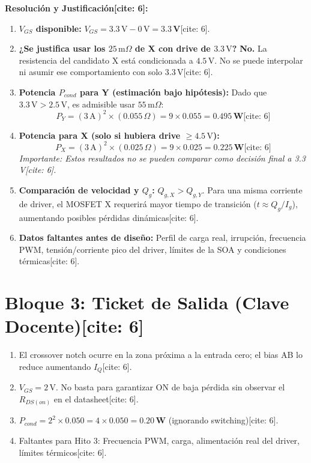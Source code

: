 \documentclass[11pt, a4paper]{article}
\begin{document}
\textbf{Resolución y Justificación[cite: 6]:}
\begin{enumerate}
    \item \textbf{$V_{GS}$ disponible:} $V_{GS} = 3.3\,\text{V} - 0\,\text{V} = \mathbf{3.3\,\text{V}}$[cite: 6].
    \item \textbf{¿Se justifica usar los $25\,\text{m}\Omega$ de X con drive de $3.3\,\text{V}$?} \textbf{No.} La resistencia del candidato X está condicionada a $4.5\,\text{V}$. No se puede interpolar ni asumir ese comportamiento con solo $3.3\,\text{V}$[cite: 6].
    \item \textbf{Potencia $P_{cond}$ para Y (estimación bajo hipótesis):} Dado que $3.3\,\text{V} > 2.5\,\text{V}$, es admisible usar $55\,\text{m}\Omega$:
    \begin{equation*}
        P_Y = (3\,\text{A})^2 \times (0.055\,\Omega) = 9 \times 0.055 = \mathbf{0.495\,\text{W}} \text{[cite: 6]}
    \end{equation*}
    \item \textbf{Potencia para X (solo si hubiera drive $\ge 4.5\,\text{V}$):}
    \begin{equation*}
        P_X = (3\,\text{A})^2 \times (0.025\,\Omega) = 9 \times 0.025 = \mathbf{0.225\,\text{W}} \text{[cite: 6]}
    \end{equation*}
    \textit{Importante: Estos resultados no se pueden comparar como decisión final a 3.3 V[cite: 6].}
    \item \textbf{Comparación de velocidad y $Q_g$:} $Q_{g,X} > Q_{g,Y}$. Para una misma corriente de driver, el MOSFET X requerirá mayor tiempo de transición ($t \approx Q_g/I_g$), aumentando posibles pérdidas dinámicas[cite: 6].
    \item \textbf{Datos faltantes antes de diseño:} Perfil de carga real, irrupción, frecuencia PWM, tensión/corriente pico del driver, límites de la SOA y condiciones térmicas[cite: 6].
\end{enumerate}

\section*{Bloque 3: Ticket de Salida (Clave Docente)[cite: 6]}
\begin{enumerate}
    \item El crossover notch ocurre en la zona próxima a la entrada cero; el bias AB lo reduce aumentando $I_Q$[cite: 6].
    \item $V_{GS} = 2\,\text{V}$. No basta para garantizar ON de baja pérdida sin observar el $R_{DS(on)}$ en el datasheet[cite: 6].
    \item $P_{cond} = 2^2 \times 0.050 = 4 \times 0.050 = \mathbf{0.20\,\text{W}}$ (ignorando switching)[cite: 6].
    \item Faltantes para Hito 3: Frecuencia PWM, carga, alimentación real del driver, límites térmicos[cite: 6].
\end{enumerate}
\end{document}
